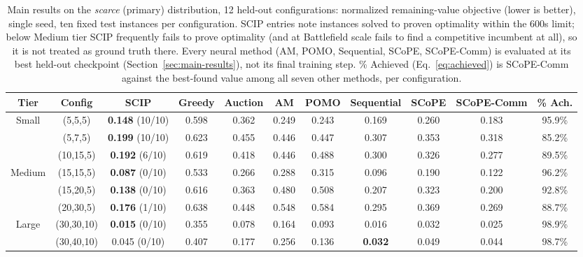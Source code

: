 \begin{table}[htbp]
\centering
\scriptsize
\caption{Main results on the \emph{scarce} (primary) distribution, 12 held-out configurations: normalized remaining-value objective (lower is better), single seed, ten fixed test instances per configuration. SCIP entries note instances solved to proven optimality within the 600s limit; below Medium tier SCIP frequently fails to prove optimality (and at Battlefield scale fails to find a competitive incumbent at all), so it is not treated as ground truth there. Every neural method (AM, POMO, Sequential, SCoPE, SCoPE-Comm) is evaluated at its best held-out checkpoint (Section~\ref{sec:main-results}), not its final training step. \% Achieved (Eq.~\eqref{eq:achieved}) is SCoPE-Comm against the best-found value among all seven other methods, per configuration.}
\label{tab:main_results}
\begin{tabular}{c|c|c|ccccccc|c}
\hline
\textbf{Tier} & \textbf{Config} & \textbf{SCIP} & \textbf{Greedy} & \textbf{Auction} & \textbf{AM} & \textbf{POMO} & \textbf{Sequential} & \textbf{SCoPE} & \textbf{SCoPE-Comm} & \textbf{\% Ach.} \\ \hline
\multirow{3}{*}{Small}       & (5,5,5)     & \textbf{0.148} (10/10) & 0.598 & 0.362 & 0.249 & 0.243 & 0.169 & 0.260 & 0.183 & 95.9\% \\
                              & (5,7,5)     & \textbf{0.199} (10/10) & 0.623 & 0.455 & 0.446 & 0.447 & 0.307 & 0.353 & 0.318 & 85.2\% \\
                              & (10,15,5)   & \textbf{0.192} (6/10)  & 0.619 & 0.418 & 0.446 & 0.488 & 0.300 & 0.326 & 0.277 & 89.5\% \\ \hline
\multirow{3}{*}{Medium}      & (15,15,5)   & \textbf{0.087} (0/10)  & 0.533 & 0.266 & 0.288 & 0.315 & 0.096 & 0.190 & 0.122 & 96.2\% \\
                              & (15,20,5)   & \textbf{0.138} (0/10)  & 0.616 & 0.363 & 0.480 & 0.508 & 0.207 & 0.323 & 0.200 & 92.8\% \\
                              & (20,30,5)   & \textbf{0.176} (1/10)  & 0.638 & 0.448 & 0.548 & 0.584 & 0.295 & 0.369 & 0.269 & 88.7\% \\ \hline
\multirow{3}{*}{Large}       & (30,30,10)  & \textbf{0.015} (0/10) & 0.355 & 0.078 & 0.164 & 0.093 & 0.016 & 0.032 & 0.025 & 98.9\% \\
                              & (30,40,10)  & 0.045 (0/10)  & 0.407 & 0.177 & 0.256 & 0.136 & \textbf{0.032} & 0.049 & 0.044 & 98.7\% \\

\end{tabular}
\end{table}
